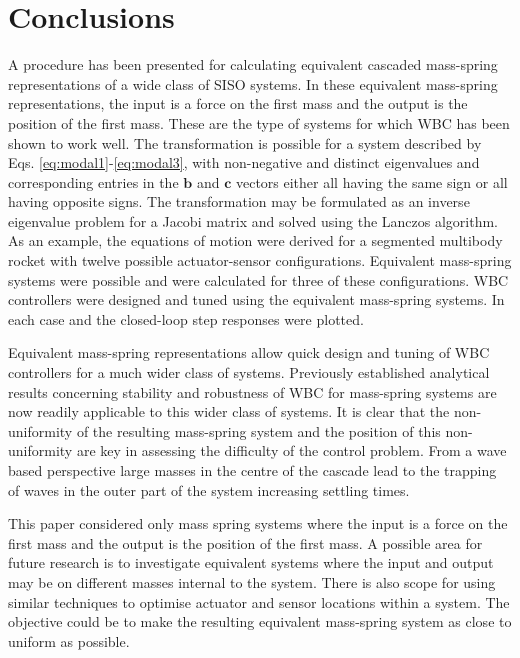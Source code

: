 \documentclass{mbd_fullpaper}
\begin{document}
\section{Conclusions}
\label{sec:conclusions}

A procedure has been presented for calculating equivalent cascaded mass-spring representations of a wide class of SISO systems.
In these equivalent mass-spring representations, the input is a force on the first mass and the output is the position of the first mass.
These are the type of systems for which WBC has been shown to work well.
The transformation is possible for a system described by Eqs. \ref{eq:modal1}-\ref{eq:modal3}, with non-negative and distinct eigenvalues and corresponding entries in the $\mathbf{b}$ and $\mathbf{c}$ vectors either all having the same sign or all having opposite signs.
The transformation may be formulated as an inverse eigenvalue problem for a Jacobi matrix and solved using the Lanczos algorithm.
As an example, the equations of motion were derived for a segmented multibody rocket with twelve possible actuator-sensor configurations.
Equivalent mass-spring systems were possible and were calculated for three of these configurations. 
WBC controllers were designed and tuned using the equivalent mass-spring systems.
In each case and the closed-loop step responses were plotted.

Equivalent mass-spring representations allow quick design and tuning of WBC controllers for a much wider class of systems.
Previously established analytical results concerning stability and robustness of WBC for mass-spring systems are now readily applicable to this wider class of systems.
It is clear that the non-uniformity of the resulting mass-spring system and the position of this non-uniformity are key in assessing the difficulty of the control problem.
From a wave based perspective large masses in the centre of the cascade lead to the trapping of waves in the outer part of the system increasing settling times.

This paper considered only mass spring systems where the input is a force on the first mass and the output is the position of the first mass.
A possible area for future research is to investigate equivalent systems where the input and output may be on different masses internal to the system.
There is also scope for using similar techniques to optimise actuator and sensor locations within a system.
The objective could be to make the resulting equivalent mass-spring system as close to uniform as possible.



\end{document}
